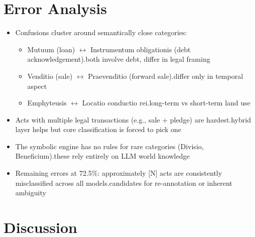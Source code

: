 \documentclass[10pt, a4paper]{article}
\begin{document}
\section{Error Analysis}

\begin{itemize}
\item Confusions cluster around semantically close categories:
  \begin{itemize}
  \item Mutuum (loan) $\leftrightarrow$ Instrumentum obligationis (debt acknowledgement).both involve debt, differ in legal framing
  \item Venditio (sale) $\leftrightarrow$ Praevenditio (forward sale).differ only in temporal aspect
  \item Emphyteusis $\leftrightarrow$ Locatio conductio rei.long-term vs short-term land use
  \end{itemize}
\item Acts with multiple legal transactions (e.g., sale + pledge) are hardest.hybrid layer helps but core classification is forced to pick one
\item The symbolic engine has no rules for rare categories (Divisio, Beneficium).these rely entirely on LLM world knowledge
\item Remaining errors at 72.5\%: approximately [N] acts are consistently misclassified across all models.candidates for re-annotation or inherent ambiguity
\end{itemize}


\section{Discussion}
\end{document}
